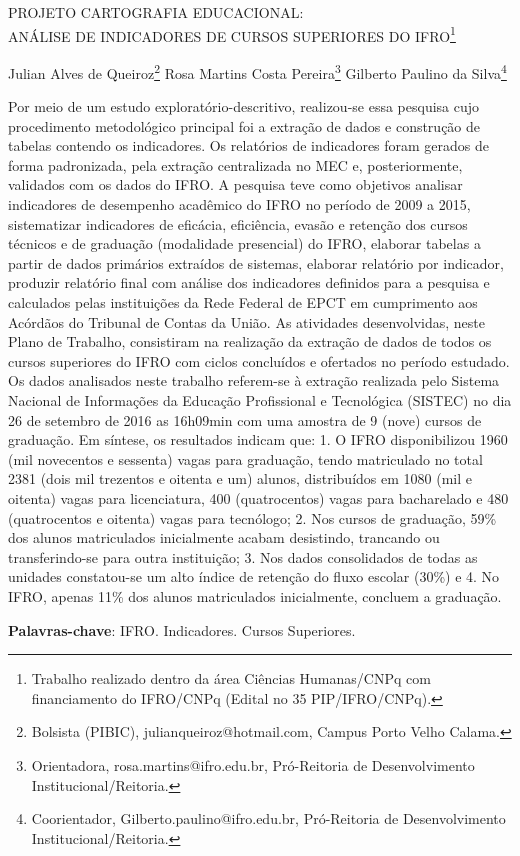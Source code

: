 \documentclass[article,12pt,onesidea,4paper,english,brazil]{abntex2}
\begin{document}
	
	
	\frenchspacing 
	
	\begin{center}
		\LARGE PROJETO CARTOGRAFIA EDUCACIONAL: \\ANÁLISE DE INDICADORES DE CURSOS SUPERIORES DO IFRO\footnote{Trabalho realizado dentro da área Ciências Humanas/CNPq com financiamento do IFRO/CNPq
			(Edital no 35 PIP/IFRO/CNPq).}
		
		\normalsize
		Julian Alves de Queiroz\footnote{Bolsista (PIBIC), julianqueiroz@hotmail.com, Campus Porto Velho Calama.} 
		Rosa Martins Costa Pereira\footnote{Orientadora, rosa.martins@ifro.edu.br, Pró-Reitoria de Desenvolvimento Institucional/Reitoria.} 
		Gilberto Paulino da Silva\footnote{Coorientador, Gilberto.paulino@ifro.edu.br, Pró-Reitoria de Desenvolvimento Institucional/Reitoria.} 
		 
	\end{center}
	
	\noindent Por meio de um estudo exploratório-descritivo, realizou-se essa pesquisa cujo
	procedimento metodológico principal foi a extração de dados e construção de
	tabelas contendo os indicadores. Os relatórios de indicadores foram gerados de
	forma padronizada, pela extração centralizada no MEC e, posteriormente, validados
	com os dados do IFRO. A pesquisa teve como objetivos analisar indicadores de
	desempenho acadêmico do IFRO no período de 2009 a 2015, sistematizar
	indicadores de eficácia, eficiência, evasão e retenção dos cursos técnicos e de
	graduação (modalidade presencial) do IFRO, elaborar tabelas a partir de dados
	primários extraídos de sistemas, elaborar relatório por indicador, produzir relatório
	final com análise dos indicadores definidos para a pesquisa e calculados pelas
	instituições da Rede Federal de EPCT em cumprimento aos Acórdãos do Tribunal
	de Contas da União. As atividades desenvolvidas, neste Plano de Trabalho,
	consistiram na realização da extração de dados de todos os cursos superiores do
	IFRO com ciclos concluídos e ofertados no período estudado. Os dados analisados
	neste trabalho referem-se à extração realizada pelo Sistema Nacional de
	Informações da Educação Profissional e Tecnológica (SISTEC) no dia 26 de
	setembro de 2016 as 16h09min com uma amostra de 9 (nove) cursos de graduação.
	Em síntese, os resultados indicam que: 1. O IFRO disponibilizou 1960 (mil
	novecentos e sessenta) vagas para graduação, tendo matriculado no total 2381
	(dois mil trezentos e oitenta e um) alunos, distribuídos em 1080 (mil e oitenta) vagas
	para licenciatura, 400 (quatrocentos) vagas para bacharelado e 480 (quatrocentos e
	oitenta) vagas para tecnólogo; 2. Nos cursos de graduação, 59\% dos alunos
	matriculados inicialmente acabam desistindo, trancando ou transferindo-se para
	outra instituição; 3. Nos dados consolidados de todas as unidades constatou-se um
	alto índice de retenção do fluxo escolar (30\%) e 4. No IFRO, apenas 11\% dos alunos
	matriculados inicialmente, concluem a graduação.
	
	\vspace{\onelineskip}
	
	\noindent
	\textbf{Palavras-chave}: IFRO. Indicadores. Cursos Superiores.
	
\end{document}
